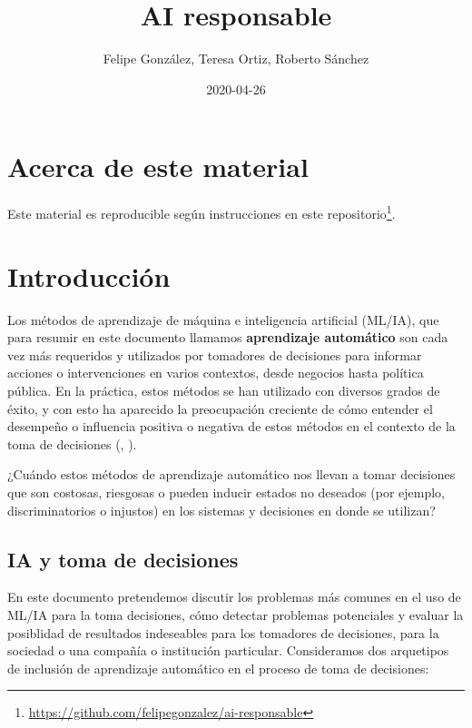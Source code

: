 \documentclass[
]{book}
\title{AI responsable}
\author{Felipe González, Teresa Ortiz, Roberto Sánchez}
\date{2020-04-26}
\renewcommand{\href}[2]{#2\footnote{\url{#1}}}
\let\BeginKnitrBlock\begin \let\EndKnitrBlock\end
\begin{document}
\frontmatter
\maketitle

{
\setcounter{tocdepth}{2}
\tableofcontents
}
\mainmatter
\hypertarget{acerca-de-este-material}{%
\chapter{Acerca de este material}\label{acerca-de-este-material}}

Este material es reproducible según instrucciones en \href{https://github.com/felipegonzalez/ai-responsable}{este repositorio}.

\mainmatter

\hypertarget{intro}{%
\chapter{Introducción}\label{intro}}

Los métodos de aprendizaje de máquina e inteligencia artificial (ML/IA), que para resumir
en este documento llamamos \textbf{aprendizaje automático} son cada vez más requeridos
y utilizados por tomadores de decisiones para informar acciones o intervenciones en varios contextos,
desde negocios hasta política pública. En la práctica, estos métodos se han utilizado con diversos
grados de éxito, y con esto ha aparecido la preocupación creciente de cómo entender
el desempeño o influencia positiva o negativa de estos métodos en el contexto de la toma de decisiones (\citep{Suresh}, \citep{barocas}).

\BeginKnitrBlock{rmdpunto}
¿Cuándo estos métodos de aprendizaje automático nos llevan a tomar decisiones que son costosas, riesgosas o pueden inducir estados
no deseados (por ejemplo, discriminatorios o injustos) en los sistemas y decisiones en donde se utilizan?
\EndKnitrBlock{rmdpunto}

\hypertarget{ia-y-toma-de-decisiones}{%
\section{IA y toma de decisiones}\label{ia-y-toma-de-decisiones}}

En este documento pretendemos discutir los problemas más comunes en el uso de ML/IA para la
toma decisiones, cómo detectar problemas potenciales y evaluar la posiblidad de resultados indeseables
para los tomadores de decisiones, para la sociedad o una compañía o institución particular. Consideramos
dos arquetipos de inclusión de aprendizaje automático en el proceso de toma de decisiones:
\end{document}
